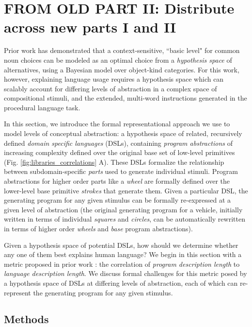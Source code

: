 \documentclass[10pt,letterpaper]{article}
\begin{document}
\section{FROM OLD PART II: Distribute across new parts I and II}

Prior work  has demonstrated that a context-sensitive, ``basic level" for common noun choices can be modeled as an optimal choice from a \textit{hypothesis space} of alternatives, using a Bayesian model over object-kind categories. For this work, however, explaining language usage requires a hypothesis space which can scalably account for differing levels of abstraction in a complex space of compositional stimuli, and the extended, multi-word instructions generated in the procedural language task.

In this section, we introduce the formal representational approach we use to model levels of conceptual abstraction: a hypothesis space of related, recursively defined \textit{domain specific languages} (DSLs), containing \textit{program abstractions} of increasing complexity defined over the original base set of low-level primitives (Fig. \ref{fig:libraries_correlations} A). These DSLs formalize the relationship between subdomain-specific \textit{parts} used to generate individual stimuli. Program abstractions for higher order parts like a \textit{wheel} are formally defined over the lower-level base primitive \textit{strokes} that generate them. Given a particular DSL, the generating program for any given stimulus can be formally re-expressed at a given level of abstraction (the original generating program for a vehicle, initially written in terms of individual \textit{squares} and \textit{circles}, can be automatically rewritten in terms of higher order \textit{wheels} and \textit{base} program abstractions).

Given a hypothesis space of potential DSLs, how should we determine whether any one of them best explains human language? We begin in this section with a metric proposed in prior work \cite{sun2021seeing}: the correlation of \textit{program description length} to \textit{language description length}. We discuss formal challenges for this metric posed by a hypothesis space of DSLs at differing levels of abstraction, each of which can re-represent the generating program for any given stimulus.

\subsection{Methods}
\end{document}
